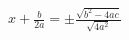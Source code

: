 \documentclass[preview]{standalone}
\begin{document}
\begin{align*}
x + \frac{b}{2 a} = \pm \frac{\sqrt{{b}^{2} - 4 a c}}{\sqrt{4 {a}^{2}}}
\end{align*}
\end{document}
